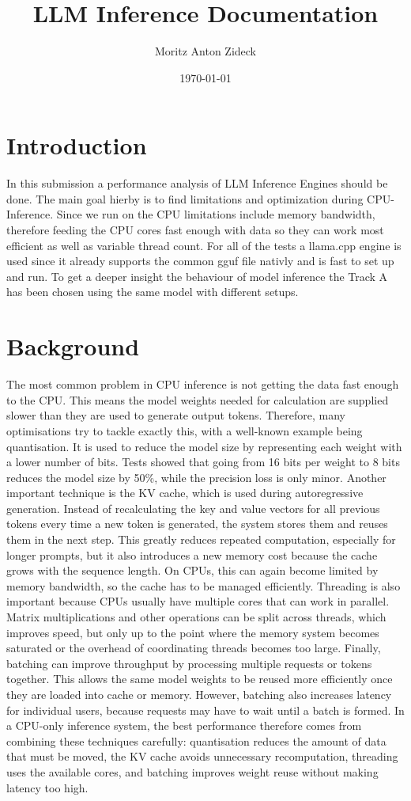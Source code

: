 \documentclass[11pt,a4paper]{article}
\title{LLM Inference Documentation}
\author{Moritz Anton Zideck}
\date{\today}
\begin{document}
\maketitle

\tableofcontents
\newpage

\section{Introduction}
In this submission a performance analysis of LLM Inference Engines should be done.
The main goal hierby is to find limitations and optimization during CPU-Inference.
Since we run on the CPU limitations include memory bandwidth, therefore feeding the CPU cores fast enough with data so they can work most efficient as well as variable thread count.
For all of the tests a llama.cpp engine is used since it already supports the common gguf file nativly and is fast to set up and run.
To get a deeper insight the behaviour of model inference the Track A has been chosen using the same model with different setups.

\section{Background}
The most common problem in CPU inference is not getting the data fast enough to the CPU.
This means the model weights needed for calculation are supplied slower than they are used to generate output tokens.
Therefore, many optimisations try to tackle exactly this, with a well-known example being quantisation.
It is used to reduce the model size by representing each weight with a lower number of bits.
Tests showed that going from 16 bits per weight to 8 bits reduces the model size by 50\%, while the precision loss is only minor.
Another important technique is the KV cache, which is used during autoregressive generation.
Instead of recalculating the key and value vectors for all previous tokens every time a new token is generated, the system stores them and reuses them in the next step.
This greatly reduces repeated computation, especially for longer prompts, but it also introduces a new memory cost because the cache grows with the sequence length.
On CPUs, this can again become limited by memory bandwidth, so the cache has to be managed efficiently.
Threading is also important because CPUs usually have multiple cores that can work in parallel.
Matrix multiplications and other operations can be split across threads, which improves speed, but only up to the point where the memory system becomes saturated or the overhead of coordinating threads becomes too large.
Finally, batching can improve throughput by processing multiple requests or tokens together. This allows the same model weights to be reused more efficiently once they are loaded into cache or memory.
However, batching also increases latency for individual users, because requests may have to wait until a batch is formed.
In a CPU-only inference system, the best performance therefore comes from combining these techniques carefully: quantisation reduces the amount of data that must be moved, the KV cache avoids unnecessary recomputation, threading uses the available cores, and batching improves weight reuse without making latency too high.
\end{document}
